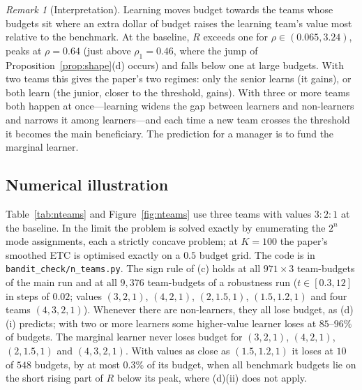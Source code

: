 \documentclass[11pt]{article}
\theoremstyle{definition}
\theoremstyle{remark}
\newtheorem{remark}{Remark}
\begin{document}
\begin{remark}[Interpretation]
Learning moves budget towards the teams whose budgets sit where an extra dollar of budget raises the learning team's
value most relative to the benchmark. At the baseline, $R$ exceeds one for $\rho\in(0.065,3.24)$, peaks at $\rho=0.64$ (just
above $\rho_1=0.46$, where the jump of Proposition~\ref{prop:shape}(d) occurs) and falls below one at large budgets. With
two teams this gives the paper's two regimes: only the senior learns (it gains), or both learn (the junior, closer to
the threshold, gains). With three or more teams both happen at once---learning widens the gap between learners and
non-learners and narrows it among learners---and each time a new team crosses the threshold it becomes the main
beneficiary. The prediction for a manager is to fund the marginal learner.
\end{remark}

\subsection{Numerical illustration}

Table~\ref{tab:nteams} and Figure~\ref{fig:nteams} use three teams with values $3:2:1$ at the baseline. In the limit the
problem is solved exactly by enumerating the $2^n$ mode assignments, each a strictly concave problem; at $K=100$ the
paper's smoothed ETC is optimised exactly on a $0.5$ budget grid. The code is in \texttt{bandit\_check/n\_teams.py}.
The sign rule of (c) holds at all $971\times3$ team-budgets of the main run and at all $9{,}376$ team-budgets of a robustness run
($t\in[0.3,12]$ in steps of $0.02$; values $(3,2,1)$, $(4,2,1)$, $(2,1.5,1)$, $(1.5,1.2,1)$ and four teams $(4,3,2,1)$).
Whenever there are non-learners, they all lose budget, as (d)(i) predicts; with two or more learners some
higher-value learner loses at $85$--$96\%$ of budgets. The marginal learner never loses budget for $(3,2,1)$,
$(4,2,1)$, $(2,1.5,1)$ and $(4,3,2,1)$. With values as close as $(1.5,1.2,1)$ it loses at $10$ of $548$ budgets, by at
most $0.3\%$ of its budget, when all benchmark budgets lie on the short rising part of $R$ below its peak, where
(d)(ii) does not apply.
\end{document}
